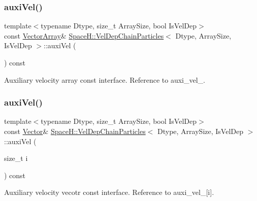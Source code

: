 \subsubsection{\texorpdfstring{auxi\+Vel()}{auxiVel()}\hspace{0.1cm}{\footnotesize\ttfamily [1/2]}}
{\footnotesize\ttfamily template$<$typename Dtype, size\+\_\+t Array\+Size, bool Is\+Vel\+Dep$>$ \\
const \mbox{\hyperlink{class_space_h_1_1_vel_indep_particles_aa9983058940249df8b00fa800e8cbad2}{Vector\+Array}}\& \mbox{\hyperlink{class_space_h_1_1_vel_dep_chain_particles}{Space\+H\+::\+Vel\+Dep\+Chain\+Particles}}$<$ Dtype, Array\+Size, Is\+Vel\+Dep $>$\+::auxi\+Vel (\begin{DoxyParamCaption}{ }\end{DoxyParamCaption}) const\hspace{0.3cm}{\ttfamily [inline]}}



Auxiliary velocity array const interface. Reference to auxi\+\_\+vel\+\_\+. 

\mbox{\label{class_space_h_1_1_vel_dep_chain_particles_a7b5b672b0b887799e3aed436509bd5b5}} 
\subsubsection{\texorpdfstring{auxi\+Vel()}{auxiVel()}\hspace{0.1cm}{\footnotesize\ttfamily [2/2]}}
{\footnotesize\ttfamily template$<$typename Dtype, size\+\_\+t Array\+Size, bool Is\+Vel\+Dep$>$ \\
const \mbox{\hyperlink{class_space_h_1_1_vel_indep_particles_a61bbcfdb0dc7f99f3c68af69a755c935}{Vector}}\& \mbox{\hyperlink{class_space_h_1_1_vel_dep_chain_particles}{Space\+H\+::\+Vel\+Dep\+Chain\+Particles}}$<$ Dtype, Array\+Size, Is\+Vel\+Dep $>$\+::auxi\+Vel (\begin{DoxyParamCaption}\item[{size\+\_\+t}]{i }\end{DoxyParamCaption}) const\hspace{0.3cm}{\ttfamily [inline]}}



Auxiliary velocity vecotr const interface. Reference to auxi\+\_\+vel\+\_\+\mbox{[}i\mbox{]}. 

